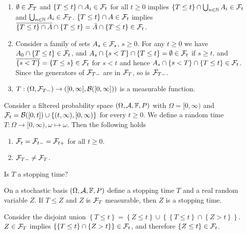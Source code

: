 \solution 
\begin{enumerate}
    \item $\emptyset \in \mathcal F_{T}$ and $\left\{ T\leq t \right\} \cap A_{i} \in
        \mathcal F_{t}$ for all $t\geq 0$ implies $\left\{ T\leq t \right\} \cap
        \bigcup_{n\in\mathbb N} A_i \in \mathcal F_t$ and $\bigcup_{n\in\mathbb N} A_i \in
        \mathcal F_{T}$. $\left\{ T \leq t \right\} \cap A \in\mathcal F_t$ implies
        $\overline{ \left\{ T\leq t \right\} \cap A } \cap \left\{ T\leq t
        \right\} = \bar A \cap \left\{ T\leq t \right\} \in \mathcal F_{t}$.
    \item Consider a family of sets $A_{s}\in\mathcal F_{s}$, $s\geq 0$. For any
        $t\geq 0$ we have $A_{0} \cap \left\{ {T\leq t} \right\} \in\mathcal F_{t}$,
        and $A_s \cap \left\{ s<T \right\} \cap \left\{ T\leq t \right\} =
        \emptyset \in\mathcal F_{t}$ if $s\geq t$, and $\overline{ \left\{ s<T
        \right\} } = \left\{ T\leq s \right\} \in \mathcal F_{t}$ for $s<t$ and hence
        $A_s \cap \left\{ s<T \right\} \cap \left\{ T\leq t \right\}
        \in\mathcal F_{t}$. Since the generators of $\mathcal F_{T-}$ are in $\mathcal F_{T}$, so is
        $\mathcal F_{T-}$.
    \item $T : (\Omega, \mathcal F_{T-}) \to ( [0,\infty], \mathcal B([0,\infty]) )$ is a
        measurable function.
\end{enumerate}

Consider a filtered probability space $(\Omega, \mathcal A, \mathbb F, P)$ with $\Omega =
[0, \infty)$ and $\mathcal F_t = \mathcal B([0,t]) \cup \left\{ (t,\infty), [0, \infty)
\right\}$ for every $t\geq 0$. We define a random time $T:\Omega\to[0,\infty),
\omega \mapsto \omega$.  Then the following holds
\begin{enumerate}
    \item $\mathcal F_{t} = \mathcal F_{t-} = \mathcal F_{t+}$ for all $t\geq 0$.
    \item $\mathcal F_{T-} \neq \mathcal F_{T}$.
\end{enumerate}
Is $T$ a stopping time?

On a stochastic basis $(\Omega, \mathcal A, \mathbb F, P)$ define a stopping time $T$ and a
real random variable $Z$. If $T \leq Z$ and $Z$ is $\mathcal F_{T}$ measurable, then
$Z$ is a stopping time.

\solution 
Consider the disjoint union $\left\{ T\leq t \right\} = \left\{ Z \leq t
\right\} \cup \left\{ \left\{ T\leq t \right\}\cap \left\{ Z>t \right\}
\right\}$. $Z\in\mathcal F_{T}$ implies $\left\{ \left\{ T\leq t \right\}\cap \left\{
Z>t \right\} \right\} \in \mathcal F_{t}$, and therefore $\left\{ Z \leq t \right\}
\in \mathcal F_{t}$.


